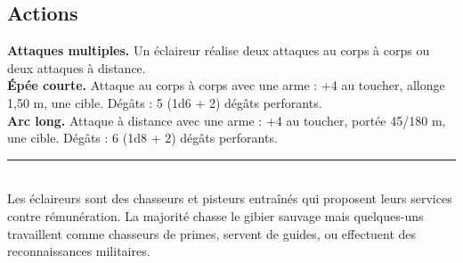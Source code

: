 \begin{figure*}[hb!]
{\begin{minipage}[c]{.45\linewidth}
    \subsection*{Actions}
    {\bfseries Attaques multiples.} Un éclaireur réalise deux attaques au corps à corps ou deux attaques à distance. \\
    {\bfseries Épée courte.} Attaque au corps à corps avec une arme : +4 au toucher, allonge 1,50 m, une cible. Dégâts : 5 (1d6 + 2) dégâts perforants. \\
    {\bfseries Arc long.} Attaque à distance avec une arme : +4 au toucher, portée 45/180 m, une cible. Dégâts : 6 (1d8 + 2) dégâts perforants. \\
    \noindent\rule{\textwidth}{1pt} \\
Les éclaireurs sont des chasseurs et pisteurs entraînés qui proposent leurs services contre rémunération. La majorité chasse le gibier sauvage mais quelques-uns travaillent comme chasseurs de primes, servent de guides, ou effectuent des reconnaissances militaires.
  \end{minipage}
}%
\end{figure*}

